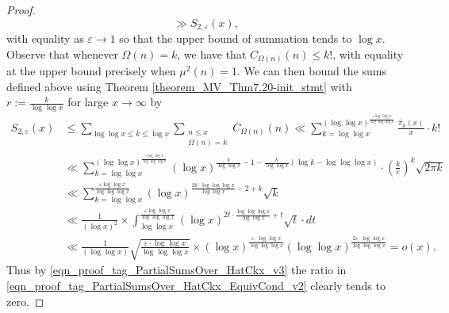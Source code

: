 \documentclass[11pt,reqno,a4letter]{article}
\numberwithin{figure}{section}
\numberwithin{table}{section}
\theoremstyle{plain}
\numberwithin{theorem}{section}
\theoremstyle{definition}
\begin{document}
\begin{proof}
\[     \gg S_{2,\varepsilon}(x),  
\]
with equality as $\varepsilon \rightarrow 1$ so that the upper bound of summation tends to $\log x$. 
Observe that whenever $\Omega(n) = k$, we have that $C_{\Omega(n)}(n) \leq k!$, with 
equality at the upper bound precisely when $\mu^2(n) = 1$. 
We can then bound the sums defined above using 
Theorem \ref{theorem_MV_Thm7.20-init_stmt} with 
$r := \frac{k}{\log\log x}$ for large $x \rightarrow \infty$ by 
\begin{align*} 
S_{2,\varepsilon}(x) & \leq 
     \sum_{\log\log x \leq k \leq \log x} \sum_{\substack{n \leq x \\ \Omega(n)=k}} C_{\Omega(n)}(n) 
     \ll \sum_{k=\log\log x}^{(\log\log x)^{\frac{\varepsilon \log\log x}{\log\log\log x}}} 
      \frac{\widehat{\pi}_k(x)}{x} \cdot k! \\ 
     & \ll \sum_{k=\log\log x}^{(\log\log x)^{\frac{\varepsilon \log\log x}{\log\log\log x}}} 
     (\log x)^{\frac{k}{\log\log x} - 1 - \frac{k}{\log\log x} \left( 
     \log k - \log\log\log x\right)} \cdot \left(\frac{k}{e}\right)^{k} \sqrt{2\pi k} \\ 
     & \ll \sum_{k=\log\log x}^{\frac{\varepsilon \log\log x}{\log\log\log x}} 
     (\log x)^{\frac{2k \cdot \log\log\log x}{\log\log x} - 2+k} \sqrt{k} \\ 
     & \ll \frac{1}{(\log x)^2} \times \int_{\log\log x}^{ 
     \frac{\varepsilon \log\log x}{\log\log\log x}} (\log x)^{2t \cdot 
     \frac{\log\log\log x}{\log\log x}+t} \sqrt{t} \cdot dt \\ 
     & \ll \frac{1}{(\log\log x)} \sqrt{\frac{\varepsilon \cdot \log\log x}{\log\log\log x}} \times 
     (\log x)^{\frac{\varepsilon \cdot \log\log x}{\log\log\log x}} 
     (\log\log x)^{\frac{2\varepsilon \cdot \log\log x}{\log\log\log x}} = o(x). 
\end{align*} 
Thus by \eqref{eqn_proof_tag_PartialSumsOver_HatCkx_v3} 
the ratio in \eqref{eqn_proof_tag_PartialSumsOver_HatCkx_EquivCond_v2} clearly tends to zero. 
\end{proof} 
\end{document}
